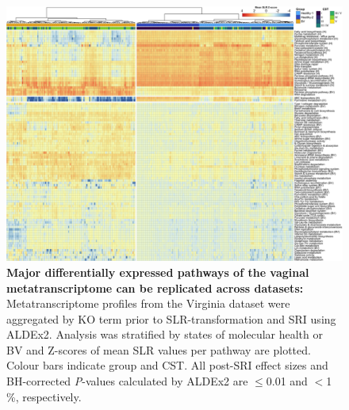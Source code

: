 \documentclass[sn-mathphys,Numbered]{sn-jnl}%
\begin{document}
\begin{figure}[H]
    \centering
    \includegraphics[scale = 0.78]{0_supplFig7.png}
    \caption{\textbf{Major differentially expressed pathways of the vaginal metatranscriptome can be replicated across datasets:} Metatranscriptome profiles from the Virginia dataset were aggregated by KO term prior to SLR-transformation and SRI using ALDEx2. Analysis was stratified by states of molecular health or BV and Z-scores of mean SLR values per pathway are plotted. Colour bars indicate group and CST. All post-SRI effect sizes and BH-corrected \textit{P}-values calculated by ALDEx2 are $\leq$0.01 and $<$1 \%, respectively.} \label{fig:sfigVirgHealthBV}
\end{figure}
\newpage
\end{document}
